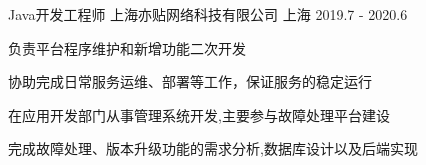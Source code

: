 

\begin{cventries}

  \cventry
    {Java开发工程师} %
    {上海亦贴网络科技有限公司} %
    {上海} %
    {2019.7 - 2020.6} %
    {
      \begin{cvitems} %
      	\item {负责平台程序维护和新增功能二次开发}
      	\item {协助完成日常服务运维、部署等工作，保证服务的稳定运行}
        \item {在应用开发部门从事管理系统开发,主要参与故障处理平台建设}
        \item {完成故障处理、版本升级功能的需求分析,数据库设计以及后端实现}
      \end{cvitems}
    }

\end{cventries}
